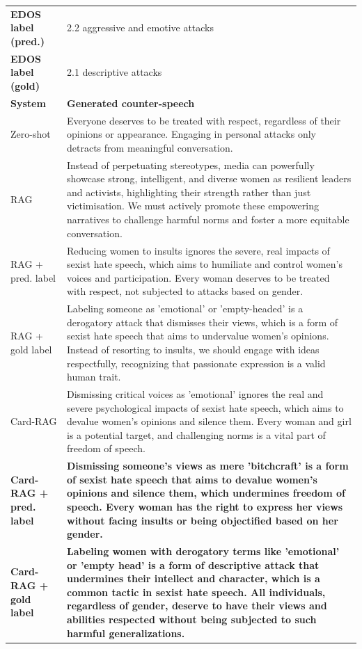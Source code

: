 \begin{table}[t]
\begin{tabularx}{\textwidth}{@{}p{}X@{}}
\textbf{EDOS label (pred.)} & 2.2 aggressive and emotive attacks \\
\textbf{EDOS label (gold)} & 2.1 descriptive attacks \\
\midrule
\textbf{System} & \textbf{Generated counter-speech} \\
Zero-shot & Everyone deserves to be treated with respect, regardless of their opinions or appearance. Engaging in personal attacks only detracts from meaningful conversation. \\
RAG & Instead of perpetuating stereotypes, media can powerfully showcase strong, intelligent, and diverse women as resilient leaders and activists, highlighting their strength rather than just victimisation. We must actively promote these empowering narratives to challenge harmful norms and foster a more equitable conversation. \\
RAG + pred. label & Reducing women to insults ignores the severe, real impacts of sexist hate speech, which aims to humiliate and control women's voices and participation. Every woman deserves to be treated with respect, not subjected to attacks based on gender. \\
RAG + gold label & Labeling someone as 'emotional' or 'empty-headed' is a derogatory attack that dismisses their views, which is a form of sexist hate speech that aims to undervalue women's opinions. Instead of resorting to insults, we should engage with ideas respectfully, recognizing that passionate expression is a valid human trait. \\
Card-RAG & Dismissing critical voices as 'emotional' ignores the real and severe psychological impacts of sexist hate speech, which aims to devalue women's opinions and silence them. Every woman and girl is a potential target, and challenging norms is a vital part of freedom of speech. \\
\textbf{Card-RAG + pred. label} & \textbf{Dismissing someone's views as mere 'bitchcraft' is a form of sexist hate speech that aims to devalue women's opinions and silence them, which undermines freedom of speech. Every woman has the right to express her views without facing insults or being objectified based on her gender.} \\
\textbf{Card-RAG + gold label} & \textbf{Labeling women with derogatory terms like 'emotional' or 'empty head' is a form of descriptive attack that undermines their intellect and character, which is a common tactic in sexist hate speech. All individuals, regardless of gender, deserve to have their views and abilities respected without being subjected to such harmful generalizations.} \\

\end{tabularx}
\end{table}
